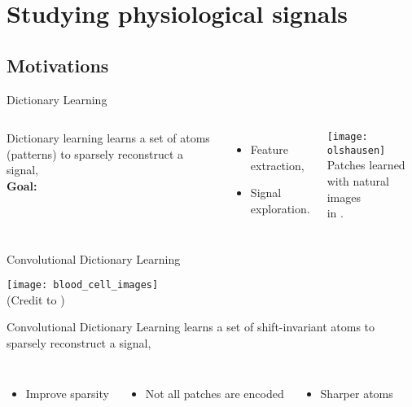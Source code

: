 \documentclass[main_dicodile]{subfiles}
\begin{document}
\section{Studying physiological signals}
\subsection{Motivations}
%
\begin{frame}{Dictionary Learning }
\begin{columns}[c]
        Dictionary learning learns a set of atoms (patterns) to sparsely
        reconstruct a signal,\\[2em]
        \textbf{Goal:}\\[1em]
        \begin{itemize}\itemsep1em
            \item Feature extraction,
            \item Signal exploration.
        \end{itemize}
    \centering
    \texttt{[image: olshausen]}\\[.5em]
    Patches learned with natural images\\ in \citealt{Olshausen1997}.
\end{columns}
\end{frame}

\begin{frame}{Convolutional Dictionary Learning }

{\centering \texttt{[image: blood\_cell\_images]}\\{\footnotesize(Credit to \citealt{Yellin2017})}\\[.5em]}

{\color{red} Convolutional} Dictionary Learning learns a set of {\color{red} shift-invariant} atoms to sparsely reconstruct a signal,
\begin{columns}[T]
    \begin{itemize}
        \item Improve sparsity
    \end{itemize}
    \begin{itemize}
        \item Not all patches are encoded
    \end{itemize}
    \begin{itemize}
        \item Sharper atoms
    \end{itemize}
\end{columns}
\end{frame}
\end{document}
